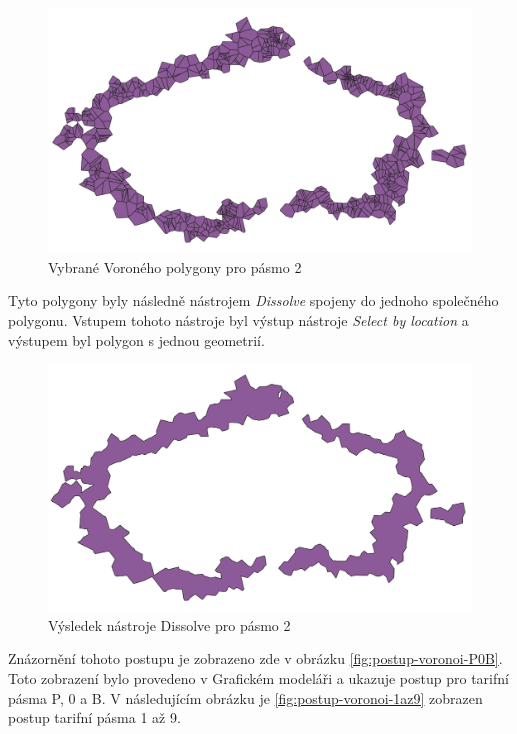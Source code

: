 \begin{figure}[H] \centering
    \includegraphics[width=400pt]{./pictures/voronoi-selected.png}
    \caption[Vybrané Voroného polygony pro pásmo 2]{Vybrané Voroného polygony pro pásmo 2}
	\label{fig:voronoi-selected}              
\end{figure}

Tyto polygony byly následně nástrojem \textit{Dissolve} spojeny do jednoho společného polygonu.
Vstupem tohoto nástroje byl výstup nástroje \textit{Select by location} a výstupem byl polygon
s jednou geometrií. 

\begin{figure}[H] \centering
    \includegraphics[width=400pt]{./pictures/dissolve.png}
    \caption[Výsledek nástroje Dissolve pro pásmo 2]{Výsledek nástroje Dissolve pro pásmo 2}
	\label{fig:dissolve}              
\end{figure} 

Znázornění tohoto postupu je zobrazeno zde v obrázku \ref{fig:postup-voronoi-P0B}. Toto zobrazení bylo provedeno v Grafickém modeláři
a ukazuje postup pro tarifní pásma P, 0 a B. V následujícím obrázku je \ref{fig:postup-voronoi-1az9} zobrazen postup tarifní pásma 1 až 9.

